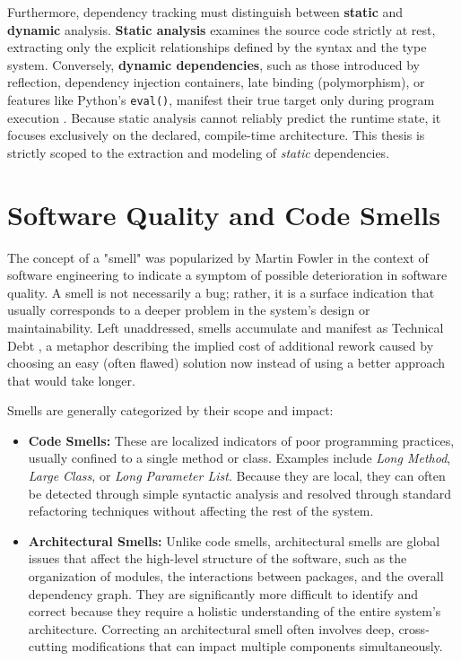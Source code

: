Furthermore, dependency tracking must distinguish between
\textbf{static} and \textbf{dynamic} analysis. \textbf{Static
analysis} examines the source code strictly at rest, extracting only
the explicit relationships defined by the syntax and the type system.
Conversely, \textbf{dynamic dependencies}, such as those introduced
by reflection, dependency injection containers, late binding
(polymorphism), or features like Python's \texttt{eval()}, manifest
their true target only during program execution
\cite{horwitz_interprocedural_1988}. Because static analysis cannot
reliably predict the runtime state, it focuses exclusively on the
declared, compile-time architecture. This thesis is strictly scoped
to the extraction and modeling of \textit{static} dependencies.

\section{Software Quality and Code Smells}
\label{sec:smells}

The concept of a "smell" was popularized by Martin Fowler in the
context of software engineering \cite{fowler_refactoring_2013} to
indicate a symptom of possible deterioration in software quality. A
smell is not necessarily a bug; rather, it is a surface indication
that usually corresponds to a deeper problem in the system's design
or maintainability. Left unaddressed, smells accumulate and manifest
as Technical Debt \cite{cunningham_wycash_1992}, a metaphor
describing the implied cost of additional rework caused by choosing
an easy (often flawed) solution now instead of using a better
approach that would take longer.

Smells are generally categorized by their scope and impact:
\begin{itemize}
  \item \textbf{Code Smells:} These are localized indicators of poor
    programming practices, usually confined to a single method or
    class. Examples include \textit{Long Method}, \textit{Large
    Class}, or \textit{Long Parameter List}. Because they are local,
    they can often be detected through simple syntactic analysis and
    resolved through standard refactoring techniques without
    affecting the rest of the system.
  \item \textbf{Architectural Smells:} Unlike code smells,
    architectural smells \cite{garcia_identifying_2009} are
    global issues that affect the high-level structure of the
    software, such as the organization of modules, the interactions
    between packages, and the overall dependency graph. They are
    significantly more difficult to identify and correct because they
    require a holistic understanding of the entire system's
    architecture. Correcting an architectural smell often involves
    deep, cross-cutting modifications that can impact multiple
    components simultaneously.
\end{itemize}

